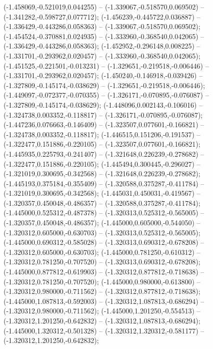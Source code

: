  (-1.458069,-0.521019,0.044255) -- (-1.339067,-0.518570,0.069502) -- (-1.341282,-0.598727,0.077712);
 (-1.456239,-0.445722,0.036887) -- (-1.336429,-0.443286,0.058363) -- (-1.339067,-0.518570,0.069502);
 (-1.454524,-0.370881,0.024935) -- (-1.333960,-0.368540,0.042065) -- (-1.336429,-0.443286,0.058363);
 (-1.452952,-0.296148,0.008225) -- (-1.331701,-0.293962,0.020457) -- (-1.333960,-0.368540,0.042065);
 (-1.451525,-0.221501,-0.013231) -- (-1.329651,-0.219518,-0.006446) -- (-1.331701,-0.293962,0.020457);
 (-1.450240,-0.146918,-0.039426) -- (-1.327809,-0.145174,-0.038629) -- (-1.329651,-0.219518,-0.006446);
 (-1.449097,-0.072377,-0.070355) -- (-1.326171,-0.070895,-0.076087) -- (-1.327809,-0.145174,-0.038629);
 (-1.448096,0.002143,-0.106016) -- (-1.324738,0.003352,-0.118817) -- (-1.326171,-0.070895,-0.076087);
 (-1.447236,0.076663,-0.146409) -- (-1.323507,0.077601,-0.166821) -- (-1.324738,0.003352,-0.118817);
 (-1.446515,0.151206,-0.191537) -- (-1.322477,0.151886,-0.220105) -- (-1.323507,0.077601,-0.166821);
 (-1.445935,0.225793,-0.241407) -- (-1.321648,0.226239,-0.278682) -- (-1.322477,0.151886,-0.220105);
 (-1.445494,0.300445,-0.296027) -- (-1.321019,0.300695,-0.342568) -- (-1.321648,0.226239,-0.278682);
 (-1.445193,0.375184,-0.355409) -- (-1.320588,0.375287,-0.411784) -- (-1.321019,0.300695,-0.342568);
 (-1.445031,0.450031,-0.419567) -- (-1.320357,0.450048,-0.486357) -- (-1.320588,0.375287,-0.411784);
 (-1.445000,0.525312,-0.487378) -- (-1.320313,0.525312,-0.565005) -- (-1.320357,0.450048,-0.486357);
 (-1.445000,0.605000,-0.544050) -- (-1.320312,0.605000,-0.630703) -- (-1.320313,0.525312,-0.565005);
 (-1.445000,0.690312,-0.585028) -- (-1.320313,0.690312,-0.678208) -- (-1.320312,0.605000,-0.630703);
 (-1.445000,0.781250,-0.610312) -- (-1.320312,0.781250,-0.707520) -- (-1.320313,0.690312,-0.678208);
 (-1.445000,0.877812,-0.619903) -- (-1.320312,0.877812,-0.718638) -- (-1.320312,0.781250,-0.707520);
 (-1.445000,0.980000,-0.613800) -- (-1.320312,0.980000,-0.711562) -- (-1.320312,0.877812,-0.718638);
 (-1.445000,1.087813,-0.592003) -- (-1.320312,1.087813,-0.686294) -- (-1.320312,0.980000,-0.711562);
 (-1.445000,1.201250,-0.554513) -- (-1.320312,1.201250,-0.642832) -- (-1.320312,1.087813,-0.686294);
 (-1.445000,1.320312,-0.501328) -- (-1.320312,1.320312,-0.581177) -- (-1.320312,1.201250,-0.642832);
